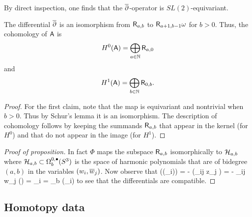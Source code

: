 \documentclass[11pt]{amsart}
\renewcommand{\op}{\operatorname}
\begin{document}
By direct inspection, one finds that the $\dbar$-operator is $SL(2)$-equivariant.

\begin{cor}
The differential $\dbar$ is an isomorphism from $\sfR_{a,b}$ to $\sfR_{a+1,b-1} \omega$ for $b > 0$.
Thus, the cohomology of $\sfA$ is 
\[
H^0(\sfA) = \bigoplus_{a \in \NN} \sfR_{a,0}
\]
and
\[
H^1(\sfA) = \bigoplus_{b \in \NN} \sfR_{0,b}.
\]
\end{cor}

\begin{proof}
For the first claim, note that the map is equivariant and nontrivial when $b > 0$. Thus by Schur's lemma it is an isomorphism.
The description of cohomology follows by keeping the summands $\sfR_{a,b}$ that appear in the kernel (for $H^0$) and that do not appear in the image (for $H^1$).
\end{proof}

%

\begin{proof}[Proof of proposition]
In fact $\Phi$ maps the subspace $\sfR_{a,b}$ isomorphically to $\cH_{a,b}$ where $\cH_{a,b} \subset \Omega^{0,\bu}_b (S^3)$ is the space of harmonic polynomials that are of bidegree $(a,b)$ in the variables $(w_i,\Bar{w}_j)$.
Now observe that
\beqn
\Phi(\dbar(\lambda_i)) = - \Phi(\ep_{ij} z_j \omega) = - \ep_{ij} w_j \Phi (\omega) = \xi_i = \dbar_b \Phi (\lambda_i) 
\eeqn
to see that the differentials are compatible.
\end{proof}

\subsection{Homotopy data}
\end{document}
